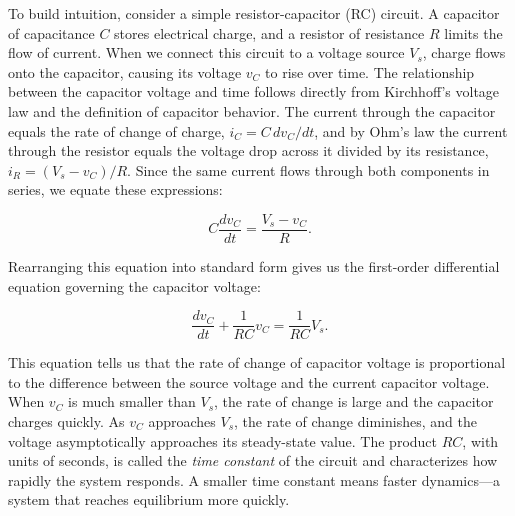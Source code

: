 To build intuition, consider a simple resistor-capacitor (RC) circuit. A capacitor of capacitance $C$ stores electrical charge, and a resistor of resistance $R$ limits the flow of current. When we connect this circuit to a voltage source $V_s$, charge flows onto the capacitor, causing its voltage $v_C$ to rise over time. The relationship between the capacitor voltage and time follows directly from Kirchhoff's voltage law and the definition of capacitor behavior. The current through the capacitor equals the rate of change of charge, $i_C = C \, dv_C/dt$, and by Ohm's law the current through the resistor equals the voltage drop across it divided by its resistance, $i_R = (V_s - v_C)/R$. Since the same current flows through both components in series, we equate these expressions:

\begin{equation}
C \frac{dv_C}{dt} = \frac{V_s - v_C}{R}.
\end{equation}

Rearranging this equation into standard form gives us the first-order differential equation governing the capacitor voltage:

\begin{equation}
\frac{dv_C}{dt} + \frac{1}{RC} v_C = \frac{1}{RC} V_s.
\end{equation}

This equation tells us that the rate of change of capacitor voltage is proportional to the difference between the source voltage and the current capacitor voltage. When $v_C$ is much smaller than $V_s$, the rate of change is large and the capacitor charges quickly. As $v_C$ approaches $V_s$, the rate of change diminishes, and the voltage asymptotically approaches its steady-state value. The product $RC$, with units of seconds, is called the \emph{time constant} of the circuit and characterizes how rapidly the system responds. A smaller time constant means faster dynamics—a system that reaches equilibrium more quickly.

